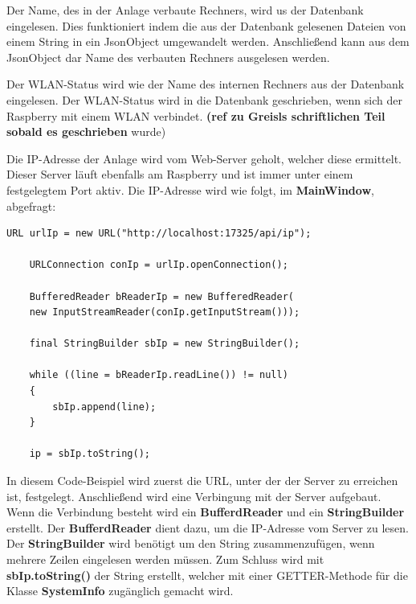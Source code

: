 \vspace{10pt}

Der Name, des in der Anlage verbaute Rechners, wird us der Datenbank eingelesen. Dies funktioniert indem die aus der Datenbank gelesenen Dateien von einem String in ein JsonObject umgewandelt werden. Anschließend kann aus dem JsonObject dar Name des verbauten Rechners ausgelesen werden.

\vspace{50pt}

Der WLAN-Status wird wie der Name des internen Rechners aus der Datenbank eingelesen. Der WLAN-Status wird in die Datenbank geschrieben, wenn sich der Raspberry mit einem WLAN verbindet. \textbf{(ref zu Greisls schriftlichen Teil sobald es geschrieben} wurde)

\vspace{10pt}

Die IP-Adresse der Anlage wird vom Web-Server geholt, welcher diese ermittelt. Dieser Server läuft ebenfalls am Raspberry und ist immer unter einem festgelegtem Port aktiv. Die IP-Adresse wird wie folgt, im \textbf{MainWindow}, abgefragt:
\begin{lstlisting}[style=JavaStyle, caption=Abfragen der IP-Adresse]
	URL urlIp = new URL("http://localhost:17325/api/ip");
	
	URLConnection conIp = urlIp.openConnection();
	
	BufferedReader bReaderIp = new BufferedReader(
	new InputStreamReader(conIp.getInputStream()));    
	
	final StringBuilder sbIp = new StringBuilder();
	
	while ((line = bReaderIp.readLine()) != null)
	{
		sbIp.append(line);
	}
            
	ip = sbIp.toString();    
\end{lstlisting}
In diesem Code-Beispiel wird zuerst die URL, unter der der Server zu erreichen ist, festgelegt. Anschließend wird eine Verbingung mit der Server aufgebaut. Wenn die Verbindung besteht wird ein \textbf{BufferdReader} und ein \textbf{StringBuilder} erstellt. Der \textbf{BufferdReader} dient dazu, um die IP-Adresse vom Server zu lesen. Der \textbf{StringBuilder} wird benötigt um den String zusammenzufügen, wenn mehrere Zeilen eingelesen werden müssen. Zum Schluss wird mit \textbf{sbIp.toString()} der String erstellt, welcher mit einer GETTER-Methode für die Klasse \textbf{SystemInfo} zugänglich gemacht wird.

\vspace{10pt}

